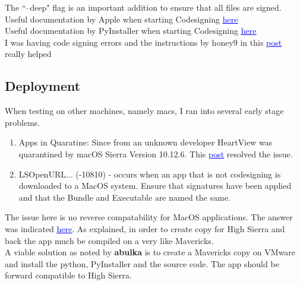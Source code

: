 \documentclass[11pt,fleqn]{book} %
\begin{document}
The ``--deep" flag is an important addition to ensure that all files are signed.\\

Useful documentation by Apple when starting Codesigning \href{https://developer.apple.com/library/archive/documentation/Security/Conceptual/CodeSigningGuide/Procedures/Procedures.html}{\textcolor{blue}{\underline{here}}}\\

Useful documentation by PyInstaller when starting Codesigning \href{https://github.com/pyinstaller/pyinstaller/wiki/Recipe-OSX-Code-Signing}{\textcolor{blue}{\underline{here}}}\\

I was having code signing errors and the instructions by honey9 in this \href{https://developer.apple.com/forums/thread/86161?login=true}{\textcolor{blue}{\underline{post}}} really helped


\subsection{Deployment}

When testing on other machines, namely macs, I ran into several early stage problems. \\

\begin{enumerate}
	\item Apps in Quaratine: Since from an unknown developer HeartView was quarantined by macOS Sierra Version 10.12.6. This \href{https://apple.stackexchange.com/questions/181026/lsopenurlswithrole-failed-with-error-10810-cant-open-install-os-x-yosemite}{\textcolor{blue}{\underline{post}}} resolved the issue.
	
	\item LSOpenURL... (-10810) - occurs when an app that is not codesigning is downloaded to a MacOS system. Ensure that signatures have been applied and that the Bundle and Executable are named the same.
\end{enumerate}


The issue here is no reverse compatability for MacOS applications. The answer was indicated \href{https://github.com/pyinstaller/pyinstaller/issues/3418}{\textcolor{blue}{\underline{here}}}. As explained, in order to create copy for High Sierra and back the app much be compiled on a very like Mavericks. \\

A viable solution as noted by \textbf{abulka} is to create a Mavericks copy on VMware and install the python, PyInstaller and the source code. The app should be forward compatible to High Sierra.
\end{document}
